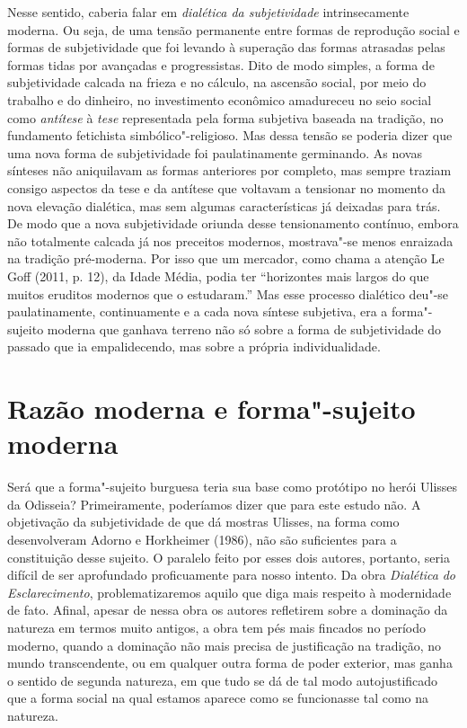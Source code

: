 Nesse sentido, caberia falar em \emph{dialética da subjetividade}
intrinsecamente moderna. Ou seja, de uma tensão permanente entre
formas de reprodução social e formas de subjetividade que foi levando à
superação das formas atrasadas pelas formas tidas por avançadas e
progressistas. Dito de modo simples, a forma de subjetividade calcada na
frieza e no cálculo, na ascensão social, por meio do trabalho e do
dinheiro, no investimento econômico amadureceu no seio social como
\emph{antítese} à \emph{tese} representada pela forma subjetiva baseada
na tradição, no fundamento fetichista simbólico"-religioso. Mas dessa
tensão se poderia dizer que uma nova forma de subjetividade foi
paulatinamente germinando. As novas sínteses não aniquilavam as formas
anteriores por completo, mas sempre traziam consigo aspectos da tese e
da antítese que voltavam a tensionar no momento da nova elevação
dialética, mas sem algumas características já deixadas para trás. De
modo que a nova subjetividade oriunda desse tensionamento contínuo,
embora não totalmente calcada já nos preceitos modernos, mostrava"-se
menos enraizada na tradição pré-moderna. Por isso que um mercador, como
chama a atenção Le Goff (2011, p. 12), da Idade Média, podia ter
``horizontes mais largos do que muitos eruditos modernos que o
estudaram.'' Mas esse processo dialético deu"-se paulatinamente,
continuamente e a cada nova síntese subjetiva, era a forma"-sujeito
moderna que ganhava terreno não só sobre a forma de subjetividade do
passado que ia empalidecendo, mas sobre a própria individualidade.

\section{Razão moderna e forma"-sujeito moderna}

Será que a forma"-sujeito burguesa teria sua base como protótipo no herói
Ulisses da Odisseia? Primeiramente, poderíamos dizer que para este
estudo não. A objetivação da subjetividade de que dá mostras Ulisses, na
forma como desenvolveram Adorno e Horkheimer (1986), não são suficientes
para a constituição desse sujeito. O paralelo feito por esses dois
autores, portanto, seria difícil de ser aprofundado proficuamente para
nosso intento. Da obra \emph{Dialética} \emph{do} \emph{Esclarecimento},
problematizaremos aquilo que diga mais respeito à modernidade de fato.
Afinal, apesar de nessa obra os autores refletirem sobre a dominação da
natureza em termos muito antigos, a obra tem pés mais fincados no
período moderno, quando a dominação não mais precisa de justificação na
tradição, no mundo transcendente, ou em qualquer outra forma de poder
exterior, mas ganha o sentido de segunda natureza, em que tudo se dá de
tal modo autojustificado que a forma social na qual estamos aparece como
se funcionasse tal como na natureza.

